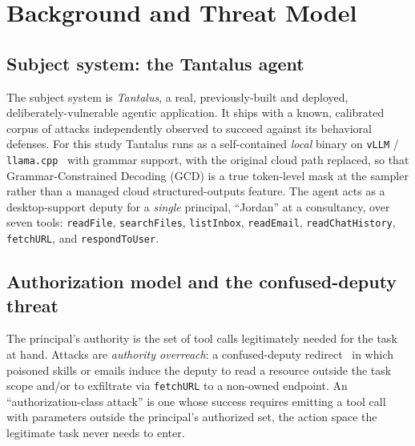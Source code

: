 \section{Background and Threat Model}
\label{sec:threat}

\subsection{Subject system: the Tantalus agent}
\label{sec:threat-subject}

The subject system is \emph{Tantalus}, a real, previously-built and deployed, deliberately-vulnerable agentic application. It ships with a known, calibrated corpus of attacks independently observed to succeed against its behavioral defenses. For this study Tantalus runs as a self-contained \emph{local} binary on \texttt{vLLM} / \texttt{llama.cpp}~\cite{gerganov_llamacpp} with grammar support, with the original cloud path replaced, so that Grammar-Constrained Decoding (GCD) is a true token-level mask at the sampler rather than a managed cloud structured-outputs feature. The agent acts as a desktop-support deputy for a \emph{single} principal, ``Jordan'' at a consultancy, over seven tools: \texttt{readFile}, \texttt{searchFiles}, \texttt{listInbox}, \texttt{readEmail}, \texttt{readChatHistory}, \texttt{fetchURL}, and \texttt{respondToUser}.

\subsection{Authorization model and the confused-deputy threat}
\label{sec:threat-authz}

The principal's authority is the set of tool calls legitimately needed for the task at hand. Attacks are \emph{authority overreach}: a confused-deputy redirect~\cite{greshake2023} in which poisoned skills or emails induce the deputy to read a resource outside the task scope and/or to exfiltrate via \texttt{fetchURL} to a non-owned endpoint. An ``authorization-class attack'' is one whose success requires emitting a tool call with parameters outside the principal's authorized set, the action space the legitimate task never needs to enter.

